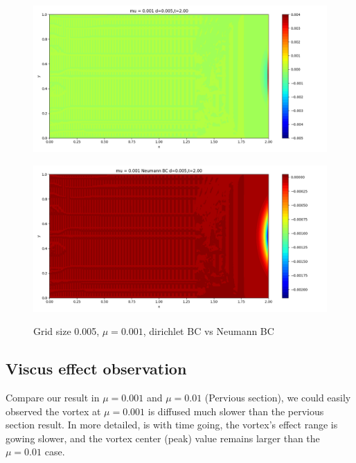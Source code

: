 \documentclass[12pt]{article}
\begin{document}
\begin{figure}[H]
\begin{minipage}{\linewidth}
    \begin{minipage}{0.5\textwidth}
    \includegraphics[width=\linewidth]{figuresmu/mu3d0.005t2.00.png}
    \label{fig9}
    \end{minipage}\hfill
    \begin{minipage}{0.5\textwidth}
    \includegraphics[width=\linewidth]{figuresmu/mu3Nud0.005t2.00.png}
    \label{fig10}
    \end{minipage}
    \caption{Grid size 0.005, $\mu = 0.001$, dirichlet BC vs Neumann BC}
    \end{minipage}
    \end{figure}



\subsection{Viscus effect observation}
Compare our result in $\mu = 0.001$ and $\mu = 0.01$ (Pervious
section), we could easily observed the vortex at $\mu=0.001$
is diffused much slower than the pervious section result. In 
more detailed, is with time going, the vortex's effect range
is gowing slower, and the vortex center (peak) value remains
 larger than the $\mu = 0.01$ case. 
\end{document}
